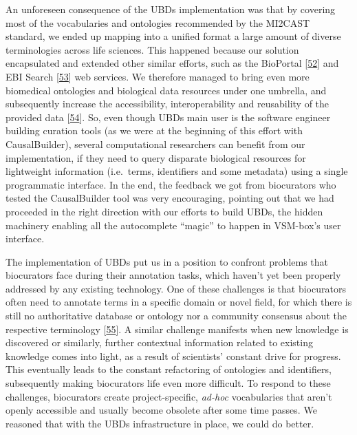 \documentclass[
  12pt,
]{book}
\begin{document}
An unforeseen consequence of the UBDs implementation was that by covering most of the vocabularies and ontologies recommended by the MI2CAST standard, we ended up mapping into a unified format a large amount of diverse terminologies across life sciences.
This happened because our solution encapsulated and extended other similar efforts, such as the BioPortal {[}\protect\hyperlink{ref-Whetzel2011}{52}{]} and EBI Search {[}\protect\hyperlink{ref-Madeira2019}{53}{]} web services.
We therefore managed to bring even more biomedical ontologies and biological data resources under one umbrella, and subsequently increase the accessibility, interoperability and reusability of the provided data {[}\protect\hyperlink{ref-Wilkinson2016}{54}{]}.
So, even though UBDs main user is the software engineer building curation tools (as we were at the beginning of this effort with CausalBuilder), several computational researchers can benefit from our implementation, if they need to query disparate biological resources for lightweight information (i.e.~terms, identifiers and some metadata) using a single programmatic interface.
In the end, the feedback we got from biocurators who tested the CausalBuilder tool was very encouraging, pointing out that we had proceeded in the right direction with our efforts to build UBDs, the hidden machinery enabling all the autocomplete ``magic'' to happen in VSM-box's user interface.

The implementation of UBDs put us in a position to confront problems that biocurators face during their annotation tasks, which haven't yet been properly addressed by any existing technology.
One of these challenges is that biocurators often need to annotate terms in a specific domain or novel field, for which there is still no authoritative database or ontology nor a community consensus about the respective terminology {[}\protect\hyperlink{ref-Hartmann2019}{55}{]}.
A similar challenge manifests when new knowledge is discovered or similarly, further contextual information related to existing knowledge comes into light, as a result of scientists' constant drive for progress.
This eventually leads to the constant refactoring of ontologies and identifiers, subsequently making biocurators life even more difficult.
To respond to these challenges, biocurators create project-specific, \emph{ad-hoc} vocabularies that aren't openly accessible and usually become obsolete after some time passes.
We reasoned that with the UBDs infrastructure in place, we could do better.
\end{document}
